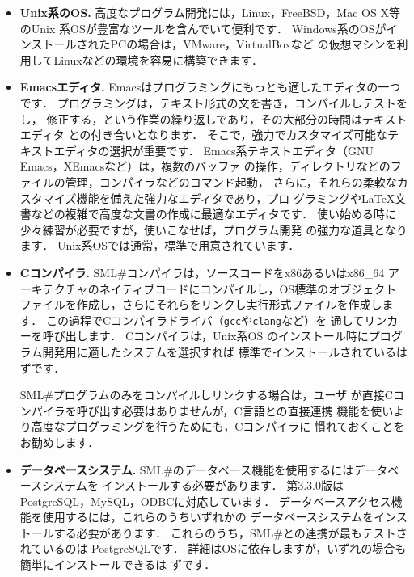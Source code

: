 \documentclass{jbook}
\newcommand{\smlsharp}{SML\#}
\newcommand{\version}{3.3.0}
\begin{document}
\begin{itemize}
\item {\bf Unix系のOS.}
	高度なプログラム開発には，Linux，FreeBSD，Mac OS X等のUnix
系OSが豊富なツールを含んでいて便利です．
	Windows系のOSがインストールされたPCの場合は，VMware，VirtualBoxなど
の仮想マシンを利用してLinuxなどの環境を容易に構築できます．

\item {\bf Emacsエディタ.}
	Emacsはプログラミングにもっとも適したエディタの一つです．
	プログラミングは，テキスト形式の文を書き，コンパイルしテストをし，
修正する，という作業の繰り返しであり，その大部分の時間はテキストエディタ
との付き合いとなります．
	そこで，強力でカスタマイズ可能なテキストエディタの選択が重要です．
	Emacs系テキストエディタ（GNU Emacs，XEmacsなど）は，複数のバッファ
の操作，ディレクトリなどのファイルの管理，コンパイラなどのコマンド起動，
さらに，それらの柔軟なカスタマイズ機能を備えた強力なエディタであり，プロ
グラミングやLaTeX文書などの複雑で高度な文書の作成に最適なエディタです．
	使い始める時に少々練習が必要ですが，使いこなせば，プログラム開発
の強力な道具となります．
	Unix系OSでは通常，標準で用意されています．

\item {\bf Cコンパイラ.}
	\smlsharp{}コンパイラは，ソースコードをx86あるいはx86\_64
アーキテクチャのネイティブコードにコンパイルし，OS標準のオブジェクト
ファイルを作成し，さらにそれらをリンクし実行形式ファイルを作成します．
	この過程でCコンパイラドライバ（{\tt gcc}や{\tt clang}など）を
通してリンカーを呼び出します．
	Cコンパイラは，Unix系OS%
のインストール時にプログラム開発用に適したシステムを選択すれば
標準でインストールされているはずです．

	\smlsharp{}プログラムのみをコンパイルしリンクする場合は，ユーザ
が直接Cコンパイラを呼び出す必要はありませんが，C言語との直接連携
機能を使いより高度なプログラミングを行うためにも，Cコンパイラに
慣れておくことをお勧めします．

\item {\bf データベースシステム.}
	\smlsharp{}のデータベース機能を使用するにはデータベースシステムを
インストールする必要があります．
	第\version{}版はPostgreSQL，MySQL，ODBCに対応しています．
	データベースアクセス機能を使用するには，これらのうちいずれかの
データベースシステムをインストールする必要があります．
	これらのうち，\smlsharp{}との連携が最もテストされているのは
PostgreSQLです．
	詳細はOSに依存しますが，いずれの場合も簡単にインストールできるは
ずです．
\end{itemize}
\end{document}

